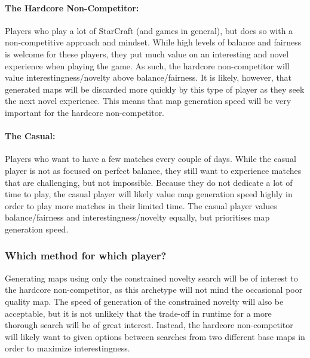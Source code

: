 \paragraph{The Hardcore Non-Competitor:} Players who play a lot of StarCraft (and games in general), but does so with a non-competitive approach and mindset. While high levels of balance and fairness is welcome for these players, they put much value on an interesting and novel experience when playing the game. As such, the hardcore non-competitor will value interestingness/novelty above balance/fairness. It is likely, however, that generated maps will be discarded more quickly by this type of player as they seek the next novel experience. This means that map generation speed will be very important for the hardcore non-competitor.

\paragraph{The Casual:} Players who want to have a few matches every couple of days. While the casual player is not as focused on perfect balance, they still want to experience matches that are challenging, but not impossible. Because they do not dedicate a lot of time to play, the casual player will likely value map generation speed highly in order to play more matches in their limited time. The casual player values balance/fairness and interestingness/novelty equally, but prioritises map generation speed.

\subsubsection{Which method for which player?}

Generating maps using only the constrained novelty search will be of interest to the hardcore non-competitor, as this archetype will not mind the occasional poor quality map. The speed of generation of the constrained novelty will also be acceptable, but it is not unlikely that the trade-off in runtime for a more thorough search will be of great interest. Instead, the hardcore non-competitor will likely want to given options between searches from two different base maps in order to maximize interestingness.

